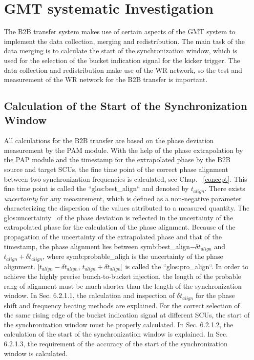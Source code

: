 \section{GMT systematic Investigation}
The B2B transfer system makes use of certain aspects of the GMT system to implement the data collection, merging and redistribution. The main task of the data merging is to calculate the start of the synchronization window, which is used for the selection of the bucket indication signal for the kicker trigger. The data collection and redistribution make use of the WR network, so the test and measurement of the WR network for the B2B transfer is important. 

\subsection{Calculation of the Start of the Synchronization Window}
All calculations for the B2B transfer are based on the phase deviation measurement by the PAM module. With the help of the phase extrapolation by the PAP module and the timestamp for the extrapolated phase by the B2B source and target SCUs, the fine time point of the correct phase alignment between two synchronization frequencies is calculated, see Chap. ~\ref{concept}. This fine time point is called the ``\gls{glos:best_align}`` and denoted by $t_\mathit{align}$. There exists \textit{uncertainty} for any measurement, which is defined as a non-negative parameter characterizing the dispersion of the values attributed to a measured quantity. The \gls{glos:uncertainty}~\cite{taylor_introduction_1982} of the phase deviation is reflected in the uncertainty of the extrapolated phase for the calculation of the phase alignment.
Because of the propagation of the uncertainty of the extrapolated phase and that of the timestamp, the phase alignment lies between \gls{symb:best_align}$-\delta t_\mathit{align}$ and $t_\mathit{align}+\delta t_\mathit{align}$, where \gls{symb:probable_aligh} is the uncertainty of the phase alignment. [$t_\mathit{align}-\delta t_\mathit{align}$, $t_\mathit{align}+\delta t_\mathit{align}$] is called the ``\gls{glos:pro_align}``. In order to achieve the highly precise bunch-to-bucket injection, the length of the probable rang of alignment must be much shorter than the length of the synchronization window. In Sec. 6.2.1.1, the calculation and inspection of $\delta t_\mathit{align}$ for the phase shift and frequency beating methods are explained. For the correct selection of the same rising edge of the bucket indication signal at different SCUs, the start of the synchronization window must be properly calculated. In Sec. 6.2.1.2, the calculation of the start of the synchronization window is explained. In Sec. 6.2.1.3, the requirement of the accuracy of the start of the synchronization window is calculated. 
